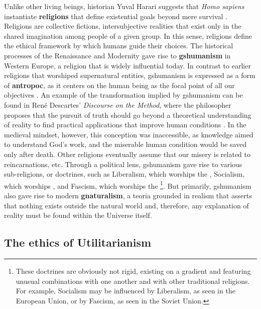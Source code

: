 \documentclass[./main_en.tex]{subfiles}
\begin{document}
\par Unlike other living beings, historian Yuval Harari suggests that \textit{Homo sapiens} instantiate \textbf{religions} that define existential goals beyond mere survival \cite{harari2015sapiens}. Religions are collective fictions, intersubjective realities that exist only in the shared imagination among people of a given group. In this sense, religions define the ethical framework by which humans guide their choices. The historical processes of the Renaissance and Modernity gave rise to \textbf{\gls{gshumanism}} in Western Europe, a religion that is widely influential today. In contrast to earlier religions that worshiped supernatural entities, \gls{gshumanism} is expressed as a form of \textbf{\gls{antropoc}}, as it centers on the human being as the focal point of all our objectives \cite{lamont1997philosophy}. An example of the transformation implied by \gls{gshumanism} can be found in René Descartes' \textit{Discourse on the Method}, where the philosopher proposes that the pursuit of truth should go beyond a theoretical understanding of reality to find practical applications that improve human conditions \cite{descartes2008discurso}. In the medieval mindset, however, this conception was inaccessible, as knowledge aimed to understand God's work, and the miserable human condition would be saved only after death. Other religions eventually assume that our misery is related to reincarnations, etc. Through a political lens, \gls{gshumanism} gave rise to various sub-religions, or doctrines, such as Liberalism, which worships the , Socialism, which worships , and Fascism, which worships the \footnote{These doctrines are obviously not rigid, existing on a gradient and featuring unusual combinations with one another and with other traditional religions. For example, Socialism may be influenced by Liberalism, as seen in the European Union, or by Fascism, as seen in the Soviet Union.}. But primarily, \gls{gshumanism} also gave rise to modern \textbf{\gls{gnaturalism}}, a \gls{teoria} grounded in realism that asserts that nothing exists outside the natural world and, therefore, any explanation of reality must be found within the Universe itself.

\subsection{The ethics of Utilitarianism} \label{subsec:bentham}
\end{document}
